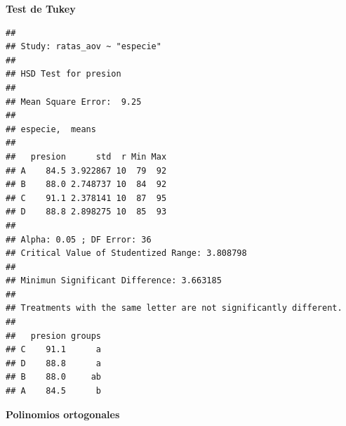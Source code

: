 \documentclass[]{book}
\theoremstyle{definition}
\theoremstyle{definition}
\theoremstyle{definition}
\theoremstyle{remark}
\begin{document}
\textbf{Test de Tukey}

\begin{verbatim}
## 
## Study: ratas_aov ~ "especie"
## 
## HSD Test for presion 
## 
## Mean Square Error:  9.25 
## 
## especie,  means
## 
##   presion      std  r Min Max
## A    84.5 3.922867 10  79  92
## B    88.0 2.748737 10  84  92
## C    91.1 2.378141 10  87  95
## D    88.8 2.898275 10  85  93
## 
## Alpha: 0.05 ; DF Error: 36 
## Critical Value of Studentized Range: 3.808798 
## 
## Minimun Significant Difference: 3.663185 
## 
## Treatments with the same letter are not significantly different.
## 
##   presion groups
## C    91.1      a
## D    88.8      a
## B    88.0     ab
## A    84.5      b
\end{verbatim}

\textbf{Polinomios ortogonales}
\end{document}
